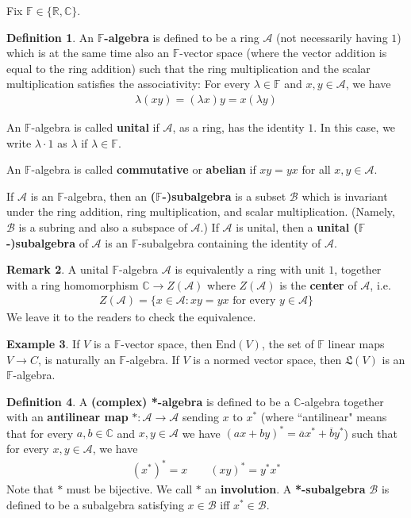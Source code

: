 \documentclass[12pt,b5paper,notitlepage]{article}
\theoremstyle{definition}
\newtheorem{df}{Definition}[section]
\newtheorem{eg}[df]{Example}
\newtheorem{rem}[df]{Remark}
\theoremstyle{plain}
\newcommand{\fk}{\mathfrak}
\newcommand{\ovl}{\overline}
\newcommand{\End}{\mathrm{End}} %
\newcommand{\scr}{\mathscr}
\newcommand{\Cbb}{\mathbb C}
\newcommand{\Rbb}{\mathbb R}
\newcommand{\Fbb}{\mathbb F}
\numberwithin{equation}{section}
\begin{document}
Fix $\Fbb\in\{\Rbb,\Cbb\}$.


\begin{df}
An \textbf{$\Fbb$-algebra}   is defined to be a ring $\scr A$ (not necessarily having $1$) which is at the same time also an $\Fbb$-vector space (where the vector addition is equal to the ring addition) such that the ring multiplication and the scalar multiplication satisfies the associativity: For every $\lambda\in\Fbb$ and $x,y\in\scr A$, we have
\begin{align}
\lambda(xy)=(\lambda x)y=x(\lambda y)
\end{align}

An $\Fbb$-algebra is called \textbf{unital}  if $\scr A$, as a ring, has the identity $1$. In this case, we write $\lambda\cdot 1$ as $\lambda$ if $\lambda\in\Fbb$. 

An $\Fbb$-algebra is called \textbf{commutative} or \textbf{abelian}   if $xy=yx$ for all $x,y\in\scr A$.

If $\scr A$ is an $\Fbb$-algebra, then an \textbf{($\Fbb$-)subalgebra}  is a subset $\scr B$ which is invariant under the ring addition, ring multiplication, and scalar multiplication. (Namely, $\scr B$ is a subring and also a subspace of $\scr A$.) If $\scr A$ is unital, then a \textbf{unital ($\Fbb$-)subalgebra} of $\scr A$ is an $\Fbb$-subalgebra containing the identity of $\scr A$.  \hfill\qedsymbol
\end{df}


\begin{rem}
A unital $\Fbb$-algebra $\scr A$ is equivalently a ring with unit $1$, together with a ring homomorphism $\Cbb\rightarrow Z(\scr A)$ where $Z(\scr A)$ is the \textbf{center} of $\scr A$, i.e.
\begin{align*}
Z(\scr A)=\{x\in\scr A:xy=yx\text{ for every }y\in\scr A\}
\end{align*}
We leave it to the readers to check the equivalence.
\end{rem}


\begin{eg}
If $V$ is a $\Fbb$-vector space, then $\End(V)$, the set of $\Fbb$ linear maps $V\rightarrow C$, is naturally an $\Fbb$-algebra. If $V$ is a normed vector space, then $\fk L(V)$ is an $\Fbb$-algebra.
\end{eg}

\begin{df}
A \textbf{(complex) *-algebra}  is defined to be a $\Cbb$-algebra together with an \textbf{antilinear map}  $*:\scr A\rightarrow\scr A$ sending $x$ to $x^*$ (where ``antilinear" means that for every $a,b\in\Cbb$ and $x,y\in\scr A$ we have $(ax+by)^*=\ovl ax^*+\ovl by^*$) such that for every $x,y\in\scr A$, we have
\begin{align*}
(x^*)^*=x\qquad (xy)^*=y^*x^*
\end{align*}
Note that $*$ must be bijective. We call $*$ an \textbf{involution}. 
 A \textbf{*-subalgebra}  $\scr B$ is defined to be a subalgebra satisfying $x\in\scr B$ iff $x^*\in\scr B$.
\end{df}
\end{document}
